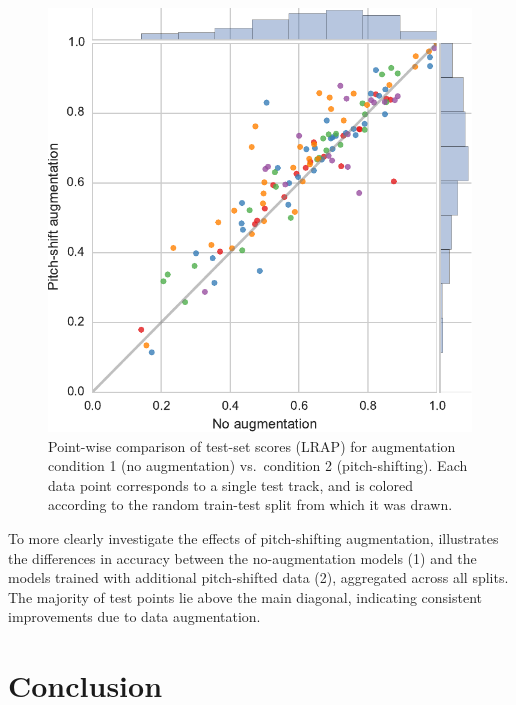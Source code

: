 \documentclass{article}
\begin{document}
\begin{figure}
    \centering
    \includegraphics[width=\columnwidth]{figs/onevstwo}
    \caption{Point-wise comparison of test-set scores (LRAP)
        for augmentation condition 1 (no augmentation) vs.\ condition 2 (pitch-shifting).
        Each data point corresponds to a single test track, and is colored according to
        the random train-test split from which it was drawn.\label{onevstwo}}
\end{figure}

To more clearly investigate the effects of pitch-shifting augmentation, 
illustrates the differences in accuracy between the no-augmentation models (1) and the
models trained with additional pitch-shifted data (2), aggregated across all splits.
The majority of test points lie above the main diagonal, indicating
consistent improvements due to data augmentation.

\section{Conclusion}


\end{document}
